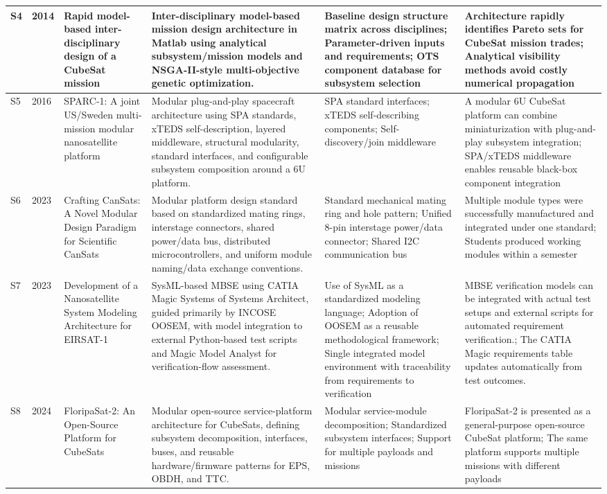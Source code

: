 \documentclass[11pt]{article}
\begin{document}
\begin{longtable}{|p{0.6cm}|p{0.8cm}|p{3.1cm}|p{4.0cm}|p{3.3cm}|p{3.3cm}|}
S4 & 2014 & Rapid model-based inter-disciplinary design of a CubeSat mission & Inter-disciplinary model-based mission design architecture in Matlab using analytical subsystem/mission models and NSGA-II-style multi-objective genetic optimization. & Baseline design structure matrix across disciplines; Parameter-driven inputs and requirements; OTS component database for subsystem selection & Architecture rapidly identifies Pareto sets for CubeSat mission trades; Analytical visibility methods avoid costly numerical propagation \\ \hline
S5 & 2016 & SPARC-1: A joint US/Sweden multi-mission modular nanosatellite platform & Modular plug-and-play spacecraft architecture using SPA standards, xTEDS self-description, layered middleware, structural modularity, standard interfaces, and configurable subsystem composition around a 6U platform. & SPA standard interfaces; xTEDS self-describing components; Self-discovery/join middleware & A modular 6U CubeSat platform can combine miniaturization with plug-and-play subsystem integration; SPA/xTEDS middleware enables reusable black-box component integration \\ \hline
S6 & 2023 & Crafting CanSats: A Novel Modular Design Paradigm for Scientific CanSats & Modular platform design standard based on standardized mating rings, interstage connectors, shared power/data bus, distributed microcontrollers, and uniform module naming/data exchange conventions. & Standard mechanical mating ring and hole pattern; Unified 8-pin interstage power/data connector; Shared I2C communication bus & Multiple module types were successfully manufactured and integrated under one standard; Students produced working modules within a semester \\ \hline
S7 & 2023 & Development of a Nanosatellite System Modeling Architecture for EIRSAT-1 & SysML-based MBSE using CATIA Magic Systems of Systems Architect, guided primarily by INCOSE OOSEM, with model integration to external Python-based test scripts and Magic Model Analyst for verification-flow assessment. & Use of SysML as a standardized modeling language; Adoption of OOSEM as a reusable methodological framework; Single integrated model environment with traceability from requirements to verification & MBSE verification models can be integrated with actual test setups and external scripts for automated requirement verification.; The CATIA Magic requirements table updates automatically from test outcomes. \\ \hline
S8 & 2024 & FloripaSat-2: An Open-Source Platform for CubeSats & Modular open-source service-platform architecture for CubeSats, defining subsystem decomposition, interfaces, buses, and reusable hardware/firmware patterns for EPS, OBDH, and TTC. & Modular service-module decomposition; Standardized subsystem interfaces; Support for multiple payloads and missions & FloripaSat-2 is presented as a general-purpose open-source CubeSat platform; The same platform supports multiple missions with different payloads \\ \hline

\end{longtable}
\end{document}
